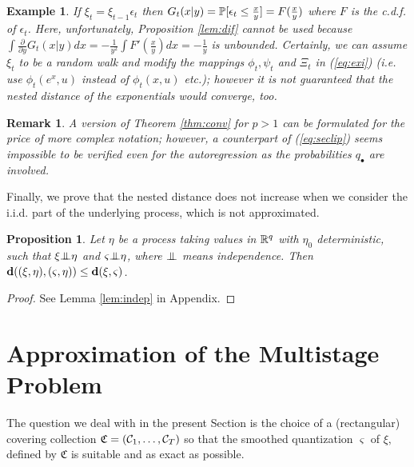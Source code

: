 \documentclass{article}              %
\newtheorem{example}{Example}
\newtheorem{proposition}{Proposition}
\newtheorem{remark}{Remark}
\begin{document}
\begin{example}
If $\xi_{t}=\xi_{t-1}\epsilon_{t}$ then $G_{t}(x|y)=\P[\epsilon_{t}\leq\frac{x}{y}]=F(\frac{x}{y})$
where $F$ is the c.d.f. of $\epsilon_{t}$. Here, unfortunately,
Proposition \ref{lem:dif} cannot be used because $\int\frac{\partial}{\partial y}G_{t}(x|y)dx=-\frac{1}{y^{2}}\int F'(\frac{x}{y})dx=-\frac{1}{y}$
is unbounded. Certainly, we can assume $\xi_{t}$ to be a random walk
and modify the mappings $\phi_{t},\psi_{t}$ and $\Xi_{t}$ in (\ref{eq:exi})
(i.e. use $\phi_{t}(e^{x},u)$ instead of $\phi_{t}(x,u)$ etc.);
however it is not guaranteed that the nested distance of the exponentials
would converge, too. 
\end{example}

\begin{remark}
A version of Theorem \ref{thm:conv} for $p>1$ can be formulated
for the price of more complex notation; however, a counterpart of (\ref{eq:seclip}) seems impossible to be verified even
for the autoregression as the probabilities $q_{\bullet}$ are involved. 
\end{remark}

\noindent Finally, we prove that the nested distance does not increase when
we consider the i.i.d. part of the underlying process, which is not approximated.
\begin{proposition}
\label{prop:witheta}Let $\eta$ be a process taking values in $\R^{q}$
with $\eta_{0}$ deterministic, such that $\xi\indep{\eta}$ and $\varsigma\indep{\eta}$, where $\indep$ means independence.
Then $\d((\xi,\eta),(\varsigma,\eta))\le\d(\xi,\varsigma)$.
\end{proposition}

\begin{proof}
See Lemma \ref{lem:indep} in Appendix. 
\end{proof}


\section{\label{sec:approx}Approximation of the Multistage Problem}

The question we deal
with in the present Section is the choice of a (rectangular) covering
collection $\mathfrak{C}=(\C_{1},\dots,\C_{T})$ so that the smoothed
quantization $\varsigma$ of $\xi,$ defined by $\mathfrak{C}$ is
suitable and as exact as possible.
\end{document}
